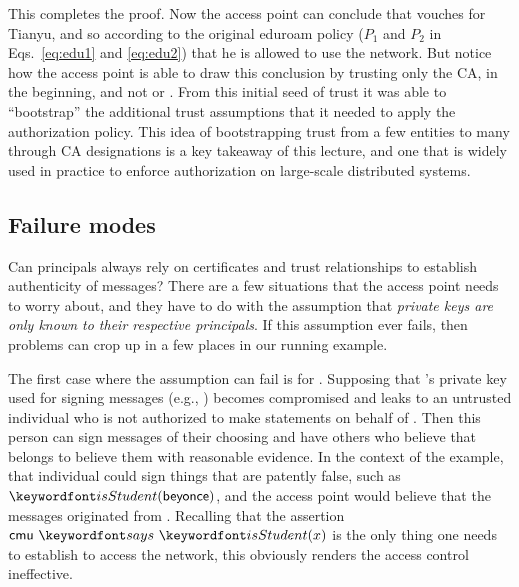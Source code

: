 \documentclass[11pt,twoside]{scrartcl}
\begin{document}
This completes the proof. Now the access point can conclude that \cmu vouches for Tianyu, and so according to the original eduroam policy ($P_1$ and $P_2$ in Eqs.~\ref{eq:edu1} and \ref{eq:edu2}) that he is allowed to use the network. But notice how the access point is able to draw this conclusion by trusting only the CA, \eduroam in the beginning, and not \cmu or \tli. From this initial seed of trust it was able to ``bootstrap'' the additional trust assumptions that it needed to apply the authorization policy. This idea of bootstrapping trust from a few entities to many through CA designations is a key takeaway of this lecture, and one that is widely used in practice to enforce authorization on large-scale distributed systems.

\subsection{Failure modes} 

Can principals always rely on certificates and trust relationships to establish authenticity of messages? There are a few situations that the access point needs to worry about, and they have to do with the assumption that \emph{private keys are only known to their respective principals}. If this assumption ever fails, then problems can crop up in a few places in our running example.

The first case where the assumption can fail is for \cmu. Supposing that \cmu's private key used for signing messages (e.g., \sign{\sk{\cmu}}{\isstu(\tli)}) becomes compromised and leaks to an untrusted individual who is not authorized to make statements on behalf of \cmu. Then this person can sign messages of their choosing and have others who believe that \pk{\cmu} belongs to \cmu believe them with reasonable evidence. In the context of the example, that individual could sign things that are patently false, such as $\isstu(\mathsf{beyonce})$, and the access point would believe that the messages originated from \cmu. Recalling that the assertion $\says{\cmu}{\isstu(x)}$ is the only thing one needs to establish to access the network, this obviously renders the access control ineffective.
\end{document}
